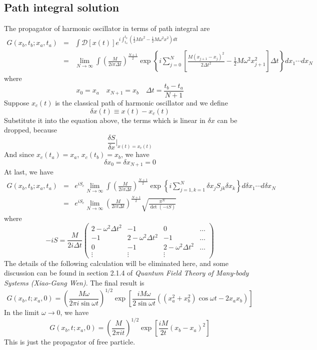 \documentclass[cyan]{elegantnote}
\begin{document}
\subsection{Path integral solution}
The propagator of harmonic oscillator in terms of path integral are
\begin{eqnarray}
G(x_b,t_b;x_a,t_a) &=& \int \mathcal{D}[x(t)] e^{i\int_{t_a}^{t_b} (\frac{1}{2}M\dot{x}^2 - \frac{1}{2}M\omega^2 x^2)dt} \nonumber \\
&=& \lim_{N \to \infty} \int \left(\frac{M}{2i\pi\Delta t}\right)^{\frac{N+1}{2}} \exp \left\{ i \sum_{j=0}^{N}\left[ \frac{M(x_{j+1}-x_{j})^2}{2\Delta t^2}   - \frac{1}{2}M\omega^2 x_{j+1}^2 \right] \Delta t \right\} dx_1 \cdots dx_N \nonumber
\end{eqnarray}
where
\[x_0 = x_a \quad x_{N+1} = x_b \quad \Delta t = \frac{t_b-t_a}{N+1}\]
Suppose $x_c(t)$ is the classical path of harmonic oscillator and we define
\[\delta x(t) \equiv x(t) - x_c(t)\]
Substitute it into the equation above, the terms which is linear in $\delta x$ can be dropped, because
\[\frac{\delta S}{\delta x} |_{x(t) = x_c(t)}\]
And since $x_c(t_a) = x_a$, $x_c(t_b) = x_b$, we have
\[\delta x_{0} = \delta x_{N+1} = 0\]
At last, we have
\begin{eqnarray}
G(x_b,t_b;x_a,t_a) &=& e^{iS_c} \lim_{N \to \infty} \int \left(\frac{M}{2i\pi\Delta t}\right)^{\frac{N+1}{2}} \exp \left\{ i \sum_{j=1,k=1}^{N} \delta x_j S_{jk} \delta x_k\right\} d\delta x_1 \cdots d\delta x_N \nonumber \\
&=& e^{iS_c} \lim_{N \to \infty} \left(\frac{M}{2i\pi\Delta t}\right)^{\frac{N+1}{2}} \sqrt{\frac{\pi^N}{\det (-iS)}}
\end{eqnarray}
where
\[-iS = \frac{M}{2i\Delta t} \left( \begin{matrix} 2-\omega^2\Delta t^2 & -1& 0& \ldots \\ -1& 2-\omega^2\Delta t^2& -1& \ldots \\ 0& -1& 2-\omega^2\Delta t^2& \ldots \\ \vdots & \vdots & \vdots & \end{matrix} \right)\]
The details of the following calculation will be eliminated here, and some discussion can be found in section 2.1.4 of \emph{Quantum Field Theory of Many-body Systems (Xiao-Gang Wen)}. The final result is\\
\[G(x_b,t;x_a,0) = \left ( \frac{M\omega}{2\pi i \sin \omega t} \right )^{1/2}\exp \left [ \frac{iM\omega}{2\sin\omega t} \left ((x_a^2 + x_b^2)\cos\omega t - 2x_a x_b  \right ) \right ]\]
In the limit $\omega \to 0$, we have
\[G(x_b,t;x_a,0) = \left ( \frac{M}{2\pi i t} \right )^{1/2}\exp \left [ \frac{iM}{2t} \left ( x_b-x_a\right)^2 \right ]\]
This is just the propagator of free particle.
\end{document}
